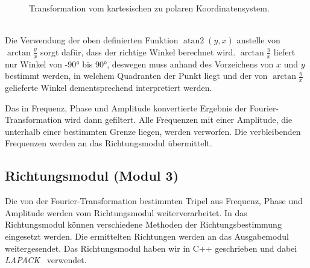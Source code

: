\begin{minipage}{0.49\textwidth}
    \begin{figure}[H]
        \centering
        \hspace*{-2cm}
        \caption{Transformation vom kartesischen zu polaren Koordinatensystem\label{fig:polarconvert}.}
    \end{figure}
\vspace{10pt}
\end{minipage}
\\
Die Verwendung der oben definierten Funktion $\operatorname{atan2}(y,x)$ anstelle von $\arctan\frac{y}{x}$ sorgt dafür, dass der richtige Winkel berechnet wird. $\arctan\frac{y}{x}$ liefert nur Winkel von \ang{-90} bis \ang{90}, deswegen muss anhand des Vorzeichens von $x$ und $y$ bestimmt werden, in welchem Quadranten der Punkt liegt und der von $\arctan\frac{y}{x}$ gelieferte Winkel dementsprechend interpretiert werden.

Das in Frequenz, Phase und Amplitude konvertierte Ergebnis der Fourier-Transformation wird dann gefiltert. Alle Frequenzen mit einer Amplitude, die unterhalb einer bestimmten Grenze liegen, werden verworfen. Die verbleibenden Frequenzen werden an das Richtungsmodul übermittelt.

\subsection{Richtungsmodul (Modul 3)}
Die von der Fourier-Transformation bestimmten Tripel aus Frequenz, Phase und Amplitude werden vom Richtungsmodul weiterverarbeitet. In das Richtungsmodul können verschiedene Methoden der Richtungsbestimmung eingesetzt werden. Die ermittelten Richtungen werden an das Ausgabemodul weitergesendet.
Das Richtungsmodul haben wir in C++ geschrieben und dabei \textit{LAPACK}~\cite{Anderson:1990:LPL:110382.110385} verwendet.
\pagebreak
